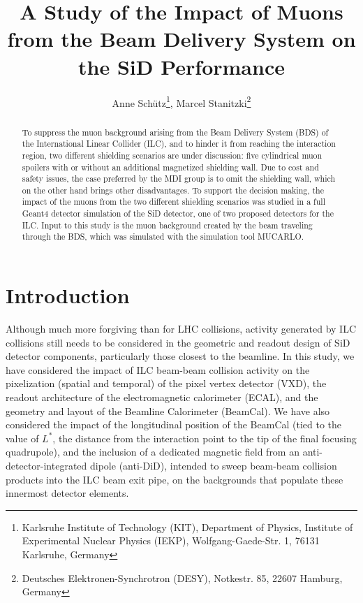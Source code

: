 \documentclass[12pt]{article}
\begin{document}

\title{A Study of the Impact of Muons from the Beam Delivery System on the SiD Performance}

\author{Anne Sch\"utz\footnote{Karlsruhe Institute of Technology (KIT), Department of Physics, Institute of Experimental Nuclear Physics (IEKP), Wolfgang-Gaede-Str. 1, 76131 Karlsruhe, Germany}, Marcel Stanitzki\footnote{Deutsches Elektronen-Synchrotron (DESY), Notkestr. 85, 22607 Hamburg, Germany}}

\maketitle

\linenumbers

\begin{abstract}
To suppress the muon background arising from the Beam Delivery System (BDS) of the International Linear Collider (ILC), and to hinder it from reaching the interaction region, two different shielding scenarios are under discussion: five cylindrical muon spoilers with or without an additional magnetized shielding wall.
Due to cost and safety issues, the case preferred by the MDI group is to omit the shielding wall, which on the other hand brings other disadvantages.
To support the decision making, the impact of the muons from the two different shielding scenarios was studied in a full Geant4 detector simulation of the SiD detector, one of two proposed detectors for the ILC. 
Input to this study is the muon background created by the beam traveling through the BDS, which was simulated with the simulation tool MUCARLO.
\end{abstract}


\section{Introduction}
\label{sec:introduction}

Although much more forgiving than for LHC collisions, activity generated by ILC collisions still needs to be considered in the geometric and readout design of SiD detector components, particularly those closest to the beamline. In this study, we have considered the impact of ILC beam-beam collision activity on the pixelization (spatial and temporal) of the pixel vertex detector (VXD), the readout architecture of the electromagnetic calorimeter (ECAL), and the geometry and layout of the Beamline Calorimeter (BeamCal). We have also considered the impact of the longitudinal position of the BeamCal (tied to the value of $L^*$, the distance from the interaction point to the tip of the final focusing quadrupole), and the inclusion of a dedicated magnetic field from an anti-detector-integrated dipole (anti-DiD), intended to sweep beam-beam collision products into the ILC beam exit pipe, on the backgrounds that populate these innermost detector elements.
\end{document}
